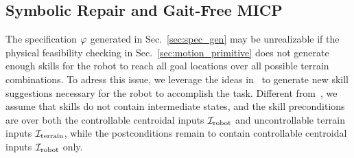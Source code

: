 \documentclass[letterpaper, 10 pt, conference]{ieeeconf}
\begin{document}






\subsection{Symbolic Repair and Gait-Free MICP}\label{sec:symbolic_repair}
The specification $\varphi$ generated in Sec.~\ref{sec:spec_gen} may be unrealizable
if the physical feasibility checking in Sec.~\ref{sec:motion_primitive} does not generate enough skills for the robot to reach all goal locations over all possible terrain combinations.
%
To adress this issue, we leverage the ideas in~\cite{pacheck2022physically} 
to
generate
new skill suggestions necessary for the robot to accomplish the task.
Different from~\cite{pacheck2022physically}, we assume that skills do not contain intermediate states,
and the skill preconditions
are over both the controllable centroidal inputs ${\mathcal I}_{\textrm{robot}}$ and uncontrollable terrain inputs ${\mathcal I}_{\textrm{terrain}}$, 
while the postconditions remain to contain 
controllable
centroidal inputs ${\mathcal I}_{\textrm{robot}}$ only.
\end{document}
